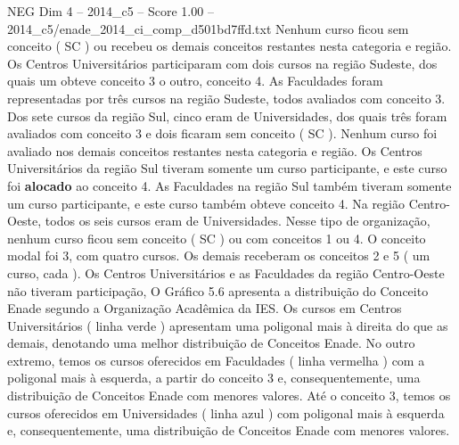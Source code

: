 \begin{textsample}{NEG Dim 4 – 2014\_c5 – Score 1.00 – 2014\_c5/enade\_2014\_ci\_comp\_d501bd7ffd.txt}
Nenhum curso ficou sem conceito ( SC ) ou recebeu os demais conceitos restantes nesta categoria e região.
Os Centros Universitários participaram com dois cursos na região Sudeste, dos quais um obteve conceito 3 o outro, conceito 4.
As Faculdades foram representadas por três cursos na região Sudeste, todos avaliados com conceito 3.
Dos sete cursos da região Sul, cinco eram de Universidades, dos quais três foram avaliados com conceito 3 e dois ficaram sem conceito ( SC ).
Nenhum curso foi avaliado nos demais conceitos restantes nesta categoria e região.
Os Centros Universitários da região Sul tiveram somente um curso participante, e este curso foi \textbf{alocado} ao conceito 4.
As Faculdades na região Sul também tiveram somente um curso participante, e este curso também obteve conceito 4.
Na região Centro-Oeste, todos os seis cursos eram de Universidades.
Nesse tipo de organização, nenhum curso ficou sem conceito ( SC ) ou com conceitos 1 ou 4.
O conceito modal foi 3, com quatro cursos.
Os demais receberam os conceitos 2 e 5 ( um curso, cada ).
Os Centros Universitários e as Faculdades da região Centro-Oeste não tiveram participação, O Gráfico 5.6 apresenta a distribuição do Conceito Enade segundo a Organização Acadêmica da IES.
Os cursos em Centros Universitários ( linha verde ) apresentam uma poligonal mais à direita do que as demais, denotando uma melhor distribuição de Conceitos Enade.
No outro extremo, temos os cursos oferecidos em Faculdades ( linha vermelha ) com a poligonal mais à esquerda, a partir do conceito 3 e, consequentemente, uma distribuição de Conceitos Enade com menores valores.
Até o conceito 3, temos os cursos oferecidos em Universidades ( linha azul ) com poligonal mais à esquerda e, consequentemente, uma distribuição de Conceitos Enade com menores valores.

\end{textsample}

